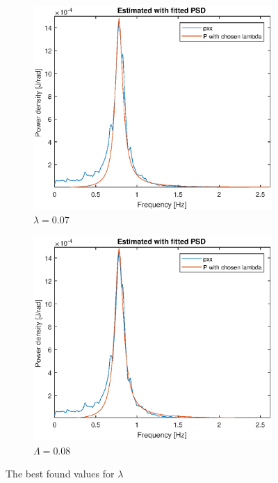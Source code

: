 \begin{figure}[H]
\begin{subfigure}{0.5\textwidth}
    \includegraphics[width=1\linewidth]{Part2_pics/p2d_lambda_007.eps}
    \caption{$\lambda = 0.07$}
\end{subfigure}
\begin{subfigure}{0.5\textwidth}
    \includegraphics[width=1\linewidth]{Part2_pics/p2d_lambda_008.eps}
    \caption{$\Lambda = 0.08$}
\end{subfigure}
\caption{The best found values for $\lambda$}
\label{fig:p2d2}
\end{figure}